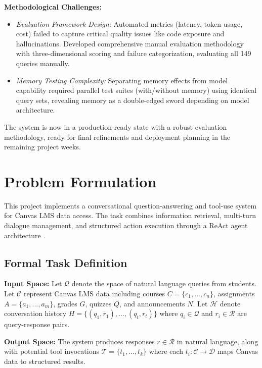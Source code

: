 \documentclass{article}
\begin{document}
\textbf{Methodological Challenges:}
\begin{itemize}
    \item \textit{Evaluation Framework Design:} Automated metrics (latency, token usage, cost) failed to capture critical quality issues like code exposure and hallucinations. Developed comprehensive manual evaluation methodology with three-dimensional scoring and failure categorization, evaluating all 149 queries manually.
    \item \textit{Memory Testing Complexity:} Separating memory effects from model capability required parallel test suites (with/without memory) using identical query sets, revealing memory as a double-edged sword depending on model architecture.
\end{itemize}

The system is now in a production-ready state with a robust evaluation methodology, ready for final refinements and deployment planning in the remaining project weeks.


\section{Problem Formulation}

This project implements a conversational question-answering and tool-use system \cite{chen2024llmma} for Canvas LMS data access. The task combines information retrieval, multi-turn dialogue management, and structured action execution through a ReAct agent architecture \cite{yao2023react}.

\subsection{Formal Task Definition}

\textbf{Input Space:} Let $\mathcal{Q}$ denote the space of natural language queries from students. Let $\mathcal{C}$ represent Canvas LMS data including courses $C = \{c_1, ..., c_n\}$, assignments $A = \{a_1, ..., a_m\}$, grades $G$, quizzes $Q$, and announcements $N$. Let $\mathcal{H}$ denote conversation history $H = \{(q_1, r_1), ..., (q_t, r_t)\}$ where $q_i \in \mathcal{Q}$ and $r_i \in \mathcal{R}$ are query-response pairs.

\textbf{Output Space:} The system produces responses $r \in \mathcal{R}$ in natural language, along with potential tool invocations $\mathcal{T} = \{t_1, ..., t_k\}$ where each $t_i: \mathcal{C} \rightarrow \mathcal{D}$ maps Canvas data to structured results.
\end{document}
